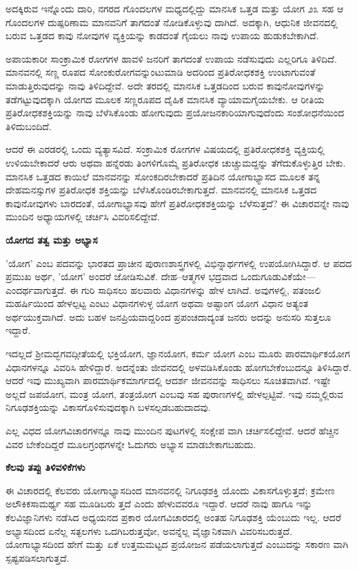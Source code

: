 ಅದಕ್ಕಿರುವ ಇನ್ನೊಂದು ದಾರಿ, ನಗರದ ಗೊಂದಲಗಳ ಮಧ್ಯದಲ್ಲಿದ್ದು ಮಾನಸಿಕ ಒತ್ತಡ ಮತ್ತು ಯೋಗ ೨೩ ಸಹ ಆ ಗೊಂದಲಗಳ ದುಷ್ಪರಿಣಾಮ ಮಾನವನಿಗೆ ತಾಗದಂತೆ ನೋಡಿಕೊಳ್ಳುವು ದಾಗಿದೆ. ಅದಕ್ಕಾಗಿ, ಆಧುನಿಕ ಜೀವನದಲ್ಲಿ ಬರುವ ಒತ್ತಡದ ಕಾವು ನೋವುಗಳ ವ್ಯಕ್ತಿಯನ್ನು ಕಾಡದಂತೆ ಗೈಯಲು ನಾವು ಉಪಾಯ ಹುಡುಕಬೇಕಾಗಿದೆ.

ಅಪಾಯಕಾರೀ ಸಾಂಕ್ರಾಮಿಕ ರೋಗಗಳ ಹಾವಳಿ ಜನರಿಗೆ ತಾಗದಂತೆ ಉಪಾಯ ನಡೆಸುವುದು ಎಲ್ಲರಿಗೂ ತಿಳಿದಿದೆ. ಮಾನವನಲ್ಲಿ ಸಣ್ಣ ರೂಪದ ಸೋಂಕುರೋಗವನ್ನುಂಟುಮಾಡಿ ಅದರಿಂದ ಪ್ರತಿರೋಧಕಶಕ್ತಿ  ಉಂಟಾಗುವಂತೆ ಮಾಡುತ್ತಿರುವುದನ್ನು ನಾವು ತಿಳಿದಿದ್ದೇವೆ. ಅದೇ ತರದಲ್ಲಿ ಮಾನಸಿಕ ಒತ್ತಡದಿಂದ ಬರುವ ಕಾವುನೋವುಗಳನ್ನು ತಡೆಗಟ್ಟುವುದಕ್ಕಾಗಿ ಯೋಗದ ಮೂಲಕ ಸಣ್ಣರೂಪದ ದೈಹಿಕ ಮಾನಸಿಕ ವ್ಯಾಯಾಮಗೈಯಬೇಕು. ಆ ರೀತಿಯ ಪ್ರತಿರೋಧಕಶಕ್ತಿಯನ್ನು ನಾವು ಬೆಳೆಸಿಕೊಂಡು ಹೋಗುವುದು ಪ್ರಯೋಜನಕಾರಿಯಾಗುವುದೆಂದು ಸಂಶೋಧನೆಯಿಂದ ತಿಳಿದುಬಂದಿದೆ.

ಆದರೆ ಈ ಎರಡರಲ್ಲಿ ಒಂದು ವ್ಯತ್ಯಾಸವಿದೆ. ಸಂಕ್ರಾಮಿಕ ರೋಗಗಳ ವಿಷಯದಲ್ಲಿ ಪ್ರತಿರೋಧಕಶಕ್ತಿ ವ್ಯಕ್ತಿಯಲ್ಲಿ ಉಳಿಯಬೇಕಾದರೆ ಆರು ಅಥವಾ ಹನ್ನೆರಡು ತಿಂಗಳಿಗೊಮ್ಮೆ ಪ್ರತಿರೋಧಕ ಚುಚ್ಚುಮದ್ದನ್ನು ತೆಗೆದುಕೊಳ್ಳುತ್ತಿರ ಬೇಕು. ಮಾನಸಿಕ ಒತ್ತಡದ ಕಾಯಿಲೆ ಮಾನವನನ್ನು ಸೋಂಕದಿರಬೇಕಾದರೆ ಪ್ರತಿದಿನ ಯೋಗಾಭ್ಯಾಸದ ಮೂಲಕ ತನ್ನ ದೇಹಮನಸ್ಸುಗಳ ಪ್ರತಿರೋಧಕ ಶಕ್ತಿಯನ್ನು ಬೆಳೆಸಿಕೊಂಡಿರಬೇಕಾಗುತ್ತದೆ. ಮಾನವನಲ್ಲಿ ಮಾನಸಿಕ ಒತ್ತಡದ ಕಾವುನೋವುಗಳು ಬಾರದಂತೆ, ಯೋಗಾಭ್ಯಾಸವು ಹೇಗೆ ಪ್ರತಿರೋಧಕಶಕ್ತಿಯನ್ನು ಬೆಳೆಸುತ್ತದೆ? ಈ ವಿಚಾರವನ್ನೇ ನಾವು ಮುಂದಿನ ಅಧ್ಯಾಯಗಳಲ್ಲಿ ಚರ್ಚಿಸಿ ವಿವರಿಸಲಿದ್ದೇವೆ.

\textbf{ಯೋಗದ ತತ್ವ ಮತ್ತು ಅಭ್ಯಾಸ}

'ಯೋಗ' ಎಂಬ ಪದವನ್ನು ಭಾರತದ ಪ್ರಾಚೀನ ಪುರಾಣಶಾಸ್ತ್ರಗಳಲ್ಲಿ ವಿಭಿನ್ನಾರ್ಥಗಳಲ್ಲಿ ಉಪಯೋಗಿಸಿದ್ದಾರೆ. ಆ ಪದದ ಪ್ರಮುಖ ಅರ್ಥ, 'ಯೋಗ' ಅಂದರೆ ಜೋಡಿಸುವಿಕೆ. ದೇಹ–ಆತ್ಮಗಳ ಭದ್ರವಾದ ಒಂದುಗೂಡುವಿಕೆಯೇ— ಎಂದರ್ಥವಾಗುತ್ತದೆ. ಈ ಗುರಿ ಸಾಧಿಸಲು ಹಲವಾರು ವಿಧಾನಗಳನ್ನು ಹೇಳ ಲಾಗಿದೆ. ಅವುಗಳಲ್ಲಿ, ಪತಂಜಲಿ ಮಹರ್ಷಿಯಿಂದ ಹೇಳಲ್ಪಟ್ಟ ಎಂಟು ವಿಧಾನಗಳುಳ್ಳ ಯೋಗ ಅಥವಾ ಅಷ್ಟಾಂಗ ಯೋಗ ವಿಧಾನ ಅತ್ಯಂತ ಅರ್ಥಯುಕ್ತವಾಗಿದೆ. ಅದು ಬಹಳ ಜನಪ್ರಿಯವಾದ್ದರಿಂದ ಪ್ರಪಂಚದಾದ್ಯಂತ ಜನರು ಅದನ್ನು ಅನುಸರಿ ಸುತ್ತಲೂ ಇದ್ದಾರೆ.

ಇದಲ್ಲದೆ ಶ‍್ರೀಮದ್ಭಗವದ್ಗೀತೆಯಲ್ಲಿ ಭಕ್ತಿಯೋಗ, ಜ್ಞಾನಯೋಗ, ಕರ್ಮ ಯೋಗ ಎಂಬ ಮೂರು ಪಾರಮಾರ್ಥಿಕಯೋಗ ವಿಧಾನಗಳನ್ನೂ ವಿವರಿಸಿ ಹೇಳಿದ್ದಾರೆ. ಅದನ್ನೆಂತು ಜೀವನದಲ್ಲಿ ಅಳವಡಿಸಿಕೊಂಡು ಹೋಗಬೇಕೆಂಬುದನ್ನೂ ತಿಳಿಸಿದ್ದಾರೆ. ಆದರೆ ಇವು ಮುಖ್ಯವಾಗಿ ಪಾರಮಾರ್ಥಿಕಮಾರ್ಗದಲ್ಲಿ ಆದರ್ಶ ಜೀವನವನ್ನು ಸಾಧಿಸಲು ಸೂಚಿತವಾಗಿವೆ. ಇಷ್ಟೇ ಅಲ್ಲದೆ ಜಪಯೋಗ, ಮಂತ್ರ ಯೋಗ, ತಂತ್ರಯೋಗ ಎಂಬವು ಸಹ ಪುರಾಣಗಳಲ್ಲಿ ಹೇಳಲ್ಪಟ್ಟಿವೆ. ಇವು ನಮ್ಮಲ್ಲಿರುವ ನಿಗೂಢಶಕ್ತಿಯನ್ನು ವಿಕಾಸಗೊಳಿಸುವುದಕ್ಕಾಗಿ ಬಳಸಲ್ಪಡಬಹುದಾದವು.

ಎಲ್ಲ ವಿಧದ ಯೋಗವಿಚಾರಗಳನ್ನೂ ನಾವು ಮುಂದಿನ ಪುಟಗಳಲ್ಲಿ ಸಂಕ್ಷೇಪ ವಾಗಿ ಚರ್ಚಿಸಲಿದ್ದೇವೆ. ಆದರೆ ಹೆಚ್ಚಿನ ವಿವರ ಬೇಕೆಂದಿದ್ದರೆ ಮೂಲಗ್ರಂಥಗಳನ್ನೇ ಓದುಗರು ಅಭ್ಯಾಸ ಮಾಡಬೇಕಾಗಬಹುದು.

\textbf{ಕೆಲವು ತಪ್ಪು ತಿಳಿವಳಿಕೆಗಳು}

ಈ ವಿಚಾರದಲ್ಲಿ ಕೆಲವರು ಯೋಗಾಭ್ಯಾಸದಿಂದ ಮಾನವನಲ್ಲಿ ನಿಗೂಢಶಕ್ತಿ ಯೊಂದು ವಿಕಾಸಗೊಳ್ಳುತ್ತದೆ; ಕ್ರಮೇಣ ಅಲೌಕಿಕಸಾಮರ್ಥ್ಯ ಸಹ ಮೂಡಿಬರು ತ್ತದೆ ಎಂದು ಹೇಳುವವರೂ ಇದ್ದಾರೆ. ಆದರೆ ನಾವು ಹಾಗೂ ಇನ್ನು ಕೆಲವಿಜ್ಞಾನಿಗಳು ನಡೆಸಿದ ಅಧ್ಯಯನದ ಪ್ರಕಾರ ಯೋಗವಿಚಾರದಲ್ಲಿ ಅಂತಹ ನಿಗೂಢಶಕ್ತಿ ಯೆಂಬುದು ಇಲ್ಲ. ಆದರೆ ಅಭ್ಯಾಸದಿಂದ ಏನೆಲ್ಲ ಸತ್ಫಲಗಳು ಒದಗಿಬರುತ್ತವೋ, ಅವನ್ನೆಲ್ಲ ವೈಜ್ಞಾನಿಕವಾಗಿ ವಿವರಿಸಬರುತ್ತದೆ. ಯೋಗಾಭ್ಯಾಸದಿಂದ ಹೇಗೆ ಮತ್ತು ಏಕೆ ಉತ್ತಮಮಟ್ಟದ ಪ್ರಯೋಜನ ಪಡೆಯಲಾಗುತ್ತದೆ ಎಂಬುದನ್ನು ಸಕಾರಣ ವಾಗಿ ಸ್ಪಷ್ಟಪಡಿಸಲಾಗುತ್ತದೆ.

